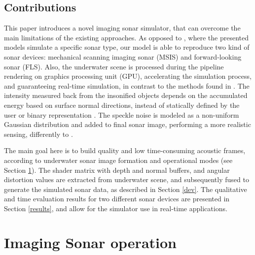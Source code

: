 \documentclass[final,5p,times]{elsarticle}
\begin{document}
\subsection{Contributions}

This paper introduces a novel imaging sonar simulator, that can overcome
the main limitations of the existing approaches. As opposed to \cite{bell1997,coiras2009,gueriot2010,sac2015,demarco2015,gu2013,kwak2015}, where
the presented models simulate a specific sonar type, our model is able to
reproduce two kind of sonar devices: mechanical scanning imaging sonar (MSIS) and forward-looking sonar (FLS). Also, the underwater scene is processed during the pipeline rendering on graphics processing unit (GPU), accelerating the simulation process, and guaranteeing  real-time simulation, in contrast to the methods found in \cite{bell1997,coiras2009,sac2015,demarco2015}. The intensity measured back from the insonified objects depends on the accumulated energy based on surface normal directions, instead of statically defined by the user \cite{demarco2015} or binary representation \cite{gu2013, kwak2015}. The speckle noise is modeled as a non-uniform Gaussian distribution and added to final sonar image, performing a more realistic sensing, differently to \cite{gueriot2010,sac2015,gu2013,kwak2015}.

The main goal here is to build quality and low time\hyp{}consuming acoustic frames, according to underwater sonar image formation and operational modes (see Section \ref{sonar:operation}). The shader matrix with depth and normal buffers, and angular distortion values are extracted from underwater scene, and subsequently fused to generate the simulated sonar data, as described in Section \ref{dev}. The qualitative and time evaluation results for two different sonar devices are presented in Section \ref{results}, and allow for the simulator use in real-time applications.


\section{Imaging Sonar operation}
\label{sonar:operation}
\end{document}
